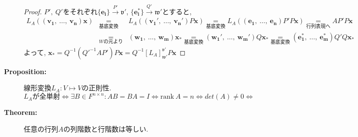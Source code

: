 \documentclass[dvipdfmx]{jsarticle}
\begin{document}
\begin{description}
        \begin{proof} $P',\ Q'$をそれぞれ$\{ \bm{e_i} \} \overset{P'}{\rightarrow} \mathfrak{v}'$, $\{ \bm{e^*_i} \} \overset{Q'}{\rightarrow} \mathfrak{w}'$とすると, 
            \begin{eqnarray*} 
                L_A( ( \bm{v_1},\ \dots,\ \bm{v_n} ) \bm{x}) &\underset{基底変換}{=}& L_A( (\bm{v_1}',\ \dots,\ \bm{v_n}' )P\bm{x} ) \underset{基底変換}{=} L_A( (\bm{e_1},\ \dots,\ \bm{e_n} )P'P\bm{x} ) \underset{行列表現へ}{=} AP'P\bm{x}  \\
                &\underset{Wの元より}{=}& ( \bm{w_1},\ \dots,\ \bm{w_m}) \bm{x_*} \underset{基底変換}{=} ( \bm{w_1}',\ \dots,\ \bm{w_m}' ) Q \bm{x_*} \underset{基底変換}{=} ( \bm{e^*_1},\ \dots,\ \bm{e^*_m} ) Q' Q \bm{x_*}
            \end{eqnarray*}
            よって, $ \bm{x_*} = Q^{-1} ( Q'^{-1} A P' ) P \bm{x} = Q^{-1} [L_A]_{\mathfrak{w}'}^{\mathfrak{v}'} P \bm{x} $
        \end{proof}

    \item[\bf{Proposition:}] 線形変換$L_A : V \mapsto V$の正則性.
        $$ L_A \text{が全単射} \Leftrightarrow \exists B \in F^{n \times n} : AB = BA = I \Leftrightarrow \mathrm{rank} \ A = n \Leftrightarrow det(A) \neq 0 \Leftrightarrow $$
        
    \item[\bf{Theorem:}] 任意の行列$A$の列階数と行階数は等しい.
        

\end{description}
\end{document}

